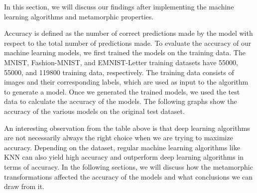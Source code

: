 In this section, we will discuss our findings after implementing the machine learning algorithms and metamorphic properties.

Accuracy is defined as the number of correct predictions made by the model with respect to the total number of predictions made. To evaluate the accuracy of our machine learning models, we first trained the models on the training data. The MNIST, Fashion-MNIST, and EMNIST-Letter training datasets have 55000, 55000, and 119800 training data, respectively. The training data consists of images and their corresponding labels, which are used as input to the algorithm to generate a model. Once we generated the trained models, we used the test data to calculate the accuracy of the models. The following graphs show the accuracy of the various models on the original test dataset.

\accuracy
    
\begin{center}
\end{center}{}
An interesting observation from the table above is that deep learning algorithms are not necessarily always the right choice when we are trying to maximize accuracy. Depending on the dataset, regular machine learning algorithms like KNN can also yield high accuracy and outperform deep learning algorithms in terms of accuracy.
In the following sections, we will discuss how the metamorphic transformations affected the accuracy of the models and what conclusions we can draw from it.
